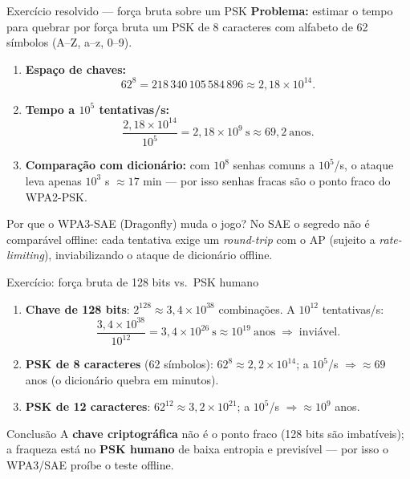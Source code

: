 \documentclass[aspectratio=169,11pt]{beamer}
\begin{document}
\begin{frame}{Exercício resolvido --- força bruta sobre um PSK}
  \textbf{Problema:} estimar o tempo para quebrar por força bruta um PSK de 8 caracteres com alfabeto de 62 símbolos (A--Z, a--z, 0--9).
  \begin{enumerate}
    \item \textbf{Espaço de chaves:}
      $$62^8 = 218\,340\,105\,584\,896 \approx 2{,}18 \times 10^{14}.$$
    \item \textbf{Tempo a $10^5$ tentativas/s:}
      $$\frac{2{,}18 \times 10^{14}}{10^5} = 2{,}18 \times 10^9\ \text{s} \approx 69{,}2\ \text{anos}.$$
    \item \textbf{Comparação com dicionário:} com $10^8$ senhas comuns a $10^5$/s, o ataque leva apenas $10^3$ s $\approx 17$ min --- por isso senhas fracas são o ponto fraco do WPA2-PSK.
  \end{enumerate}
  \begin{alertblock}{Por que o WPA3-SAE (Dragonfly) muda o jogo?}
    No SAE o segredo não é comparável offline: cada tentativa exige um \emph{round-trip} com o AP (sujeito a \emph{rate-limiting}), inviabilizando o ataque de dicionário offline.
  \end{alertblock}
\end{frame}

\begin{frame}{Exercício: força bruta de 128 bits vs.\ PSK humano}
  \begin{enumerate}
    \item \textbf{Chave de 128 bits}: $2^{128} \approx 3{,}4\times10^{38}$ combinações. A $10^{12}$ tentativas/s:
      $$\frac{3{,}4\times10^{38}}{10^{12}} = 3{,}4\times10^{26}\ \text{s} \approx 10^{19}\ \text{anos} \;\Rightarrow\; \text{inviável.}$$
    \item \textbf{PSK de 8 caracteres} (62 símbolos): $62^8 \approx 2{,}2\times10^{14}$; a $10^5$/s $\Rightarrow \approx 69$ anos (o dicionário quebra em minutos).
    \item \textbf{PSK de 12 caracteres}: $62^{12} \approx 3{,}2\times10^{21}$; a $10^5$/s $\Rightarrow \approx 10^9$ anos.
  \end{enumerate}
  \pause
  \begin{alertblock}{Conclusão}
    A \textbf{chave criptográfica} não é o ponto fraco (128 bits são imbatíveis); a fraqueza está no \textbf{PSK humano} de baixa entropia e previsível --- por isso o WPA3/SAE proíbe o teste offline.
  \end{alertblock}
\end{frame}
\end{document}
